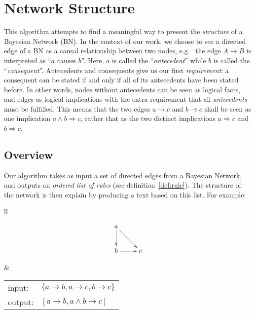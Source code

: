 \documentclass[a4paper]{article}
\newcounter{definition}[section] %
\newcommand*{\say}[1]{``{#1}''}
\newcommand*{\eg}{e.g.\ }
\newcommand*{\rar}{\rightarrow}                         %
\newcommand*{\conj}{\wedge}                             %
\renewcommand*{\implies}{\Rightarrow}                   %
\begin{document}
\section{Network Structure}

This algorithm attempts to find a meaningful way to present the \emph{structure} of a Bayesian Network (BN).
In the context of our work, we choose to see a directed edge of a BN as a causal relationship between two nodes,
\eg{} the edge $A\rar B$ is interpreted as \say{$a$ causes $b$}.
Here, $a$ is called the \say{\emph{antecedent}} while $b$ is called the \say{\emph{consequent}}.
Antecedents and consequents give us our first \emph{requirement}:
a consequent can be stated if and only if all of its antecedents have been stated before.
In other words, nodes without antecedents can be seen as logical facts, and edges as logical implications
with the extra requirement that all \emph{antecedents} must be fulfilled.
This means that the two edges $a\rar c$ and $b\rar c$ shall be seen as one implication $a\conj b \implies c$,
rather that as the two distinct implications $a\implies c$ and $b\implies c$.

\subsection{Overview}

Our algorithm takes as input a set of directed edges from a Bayesian Network,
and outputs an \emph{ordered list of rules} (see definition~\ref{def:rule}).
The structure of the network is then explain by producing a text based on this list.
For example:

\begin{center}
  \begin{tabular}{ll}
    \begin{minipage}{0.30\textwidth}
      \[
      \xymatrix{%
        a \ar[d] \ar[rd]  &  \\
        b \ar[r]          & c
      }
      \]
    \end{minipage}
    &
    \begin{minipage}{0.60\textwidth}
    \begin{tabular}{ll}
      input:  & $ \{a\rar b, a\rar c, b\rar c\} $ \\
      output: & $ [a\rar b, a\conj b\rar c] $
    \end{tabular}
    \end{minipage}
  \end{tabular}
\end{center}
\end{document}
